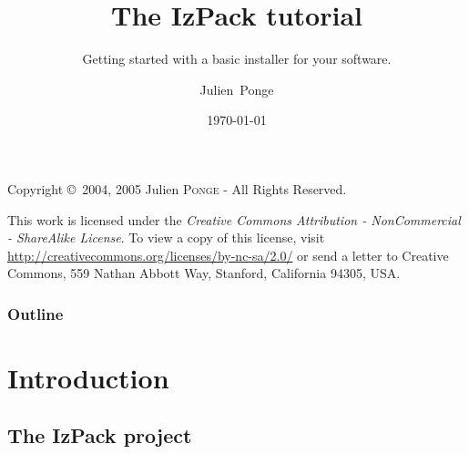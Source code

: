 \documentclass[compress,10pt]{beamer}
\title{The IzPack tutorial}
\subtitle{Getting started with a basic installer for your software.}
\author{Julien~Ponge\inst{1}}
\institute
{
  \inst{1}%
  \texttt{<julien@izforge.com>}\\
  \url{http://izpack.org/}\\
  IzPack project founder and current maintainer.
}
\date{\today}
\begin{document}

\begin{frame}
  \titlepage
\end{frame}


\begin{frame}[plain]

\footnotesize

\href{http://www.creativecommons.org/}{}

\vspace{2em}

Copyright \copyright~2004, 2005 Julien \textsc{Ponge} - All Rights Reserved.

\vspace{2em}
\sloppy
This work is licensed under the \textit{Creative Commons
Attribution - NonCommercial - ShareAlike License}. To view a copy of this license,
visit
\href{http://creativecommons.org/licenses/by-nc-sa/2.0/}{\url{http://creativecommons.org/licenses/by-nc-sa/2.0/}}
or send a letter to Creative Commons, 559 Nathan Abbott Way, Stanford,
California 94305, USA.

\end{frame}


\begin{frame}
  \frametitle{Outline}
  \tableofcontents
\end{frame}


\section{Introduction}


\subsection{The IzPack project}

\end{document}
